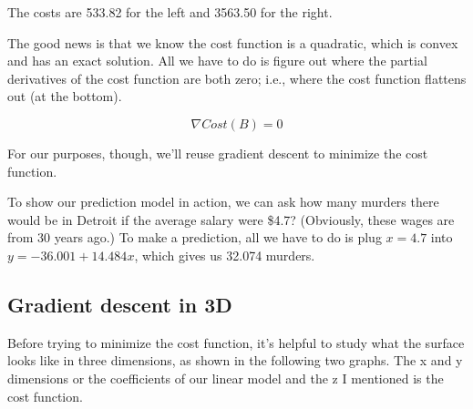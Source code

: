 \begin{fullwidth}
\noindent The costs are 533.82 for the left and 3563.50 for the right.

The good news is that we know the cost function is a quadratic, which is convex and has an exact solution. All we have to do is figure out where the partial derivatives of the cost function are both zero; i.e., where the cost function flattens out (at the bottom).

\[\tag{Analytic solution to optimization}
\nabla Cost(B) = 0
\]

\noindent For our purposes, though, we'll reuse gradient descent to minimize the cost function.

To show our prediction model in action, we can ask how many murders  there would be in Detroit if the average salary were \$4.7? (Obviously, these wages are from 30 years ago.) To make a prediction, all we have to do is plug $x=4.7$ into $y = -36.001 + 14.484 x$, which gives us 32.074 murders.

\subsection{Gradient descent in 3D}


Before trying to minimize the cost function, it's helpful to study what the surface looks like in three dimensions, as shown in the following two graphs. The x and y dimensions or the coefficients of our linear model and the z I mentioned is the cost function.


\end{fullwidth}
